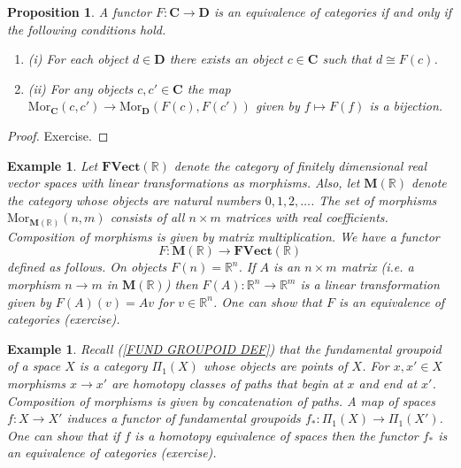 \documentclass[11pt, letterpaper, oneside]{report}
\theoremstyle{pplain}
\newtheorem{proposition}[theorem]{Proposition}
\theoremstyle{ddefinition}
\newtheorem{example}[theorem]{Example}
\theoremstyle{nnn}
\theoremstyle{eexercise}
\newcommand{\R}{{\mathbb R}}
\newcommand{\Mor}{\mathrm{Mor}}
\newcommand{\CC}{{\mathbf C}}
\newcommand{\DD}{{\mathbf D}}
\newcommand{\benu}{\begin{enumerate}}
\newcommand{\eenu}{\end{enumerate}}
\begin{document}
\begin{proposition}
\label{CAT EQUIV PROP}
A functor $F\colon \CC \to \DD$ is an equivalence of categories if and only if the following conditions hold. 
\benu
\item[(i)] For each object $d\in \DD$ there exists an object $c\in \CC$ such that $d\cong F(c)$. 
\item[(ii)] For any objects $c, c'\in \CC$ the map $\Mor_{\CC}(c, c') \to \Mor_{\DD}(F(c), F(c'))$ given by 
$f\mapsto F(f)$ is a bijection.
\eenu

\end{proposition}

\begin{proof}
Exercise. 
\end{proof}

\begin{example}
Let $\mathbf{FVect(\R)}$ denote the category of finitely dimensional real vector spaces with linear transformations 
as morphisms. Also, let $\mathbf{M(\R)}$ denote the category whose objects are natural numbers $0, 1, 2, \dots$. 
The set of morphisms $\Mor_{\mathbf{M(\R)}}(n, m)$ consists of all $n\times m$ matrices with real coefficients. 
Composition of morphisms is given by matrix multiplication. 
We have a functor
$$F\colon \mathbf{M(\R)} \to \mathbf{FVect(\R)}$$
defined as follows. On objects  $F(n) = \R^{n}$. If $A$ is an $n\times m$ matrix  (i.e. a morphism $n\to m$ in 
$\mathbf{M(\R)}$) then $F(A)\colon \R^{n}\to \R^{m}$
is a linear transformation given by $F(A)(v) = Av$ for $v\in \R^{n}$.  One can show that $F$ is an equivalence of 
categories (exercise). 
\end{example}

\begin{example}
Recall (\ref{FUND GROUPOID DEF}) that the fundamental groupoid of a space $X$ is a category $\Pi_{1}(X)$
whose objects are points of $X$. For $x, x'\in X$ morphisms $x\to x'$ are homotopy classes of paths that begin
at $x$ and end at $x'$. Composition of morphisms is given by concatenation of paths. A map of spaces 
$f\colon X \to X'$ induces a functor of fundamental groupoids $f_{\ast}\colon \Pi_{1}(X) \to \Pi_{1}(X')$. 
One can show that if $f$ is a homotopy equivalence of spaces then the functor $f_{\ast}$ is an equivalence 
of categories (exercise). 
\end{example}

\end{document}
